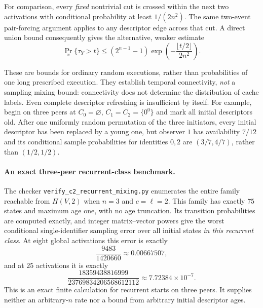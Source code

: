 For comparison, every \emph{fixed} nontrivial cut is crossed
within the next two activations with conditional probability
at least $1/(2n^2)$. The same two-event pair-forcing argument
applies to any descriptor edge across that cut. A direct union
bound consequently gives the alternative, weaker estimate
\[
 \Pr_x\{\tau_Y>t\}
 \le(2^{n-1}-1)
 \exp\!\left(-\frac{\lfloor t/2\rfloor}{2n^2}\right).
\]

These are bounds for ordinary random executions, rather than
probabilities of one long prescribed execution. They establish
temporal connectivity, \emph{not} a sampling mixing bound:
connectivity does not determine the distribution of cache labels.
Even complete descriptor refreshing is insufficient by itself.
For example, begin on three peers at
$C_0=\varnothing$, $C_1=C_2=\{0^0\}$ and mark all initial
descriptors old. After one uniformly random permutation of the
three initiators, every initial descriptor has been replaced by
a young one, but observer $1$ has availability $7/12$ and its
conditional sample probabilities for identities $0,2$ are
$(3/7,4/7)$, rather than $(1/2,1/2)$.

\paragraph{An exact three-peer recurrent-class benchmark.}
The checker \texttt{verify\_c2\_recurrent\_mixing.py} enumerates
the entire family reachable from $H(V,2)$ when $n=3$ and
$c=\ell=2$. This family has exactly $75$ states and maximum
age one, with no age truncation. Its transition probabilities
are computed exactly, and integer matrix--vector powers give
the worst conditional single-identifier sampling error over
all initial states \emph{in this recurrent class}. At eight
global activations this error is exactly
\[
 \frac{9483}{1420660}\approx0.00667507,
\]
and at $25$ activations it is exactly
\[
 \frac{18359438816999}{23769834206568612112}
 \approx7.72384\times10^{-7}.
\]
This is an exact finite calculation for recurrent starts on
three peers. It supplies neither an arbitrary-$n$ rate nor a
bound from arbitrary initial descriptor ages.
